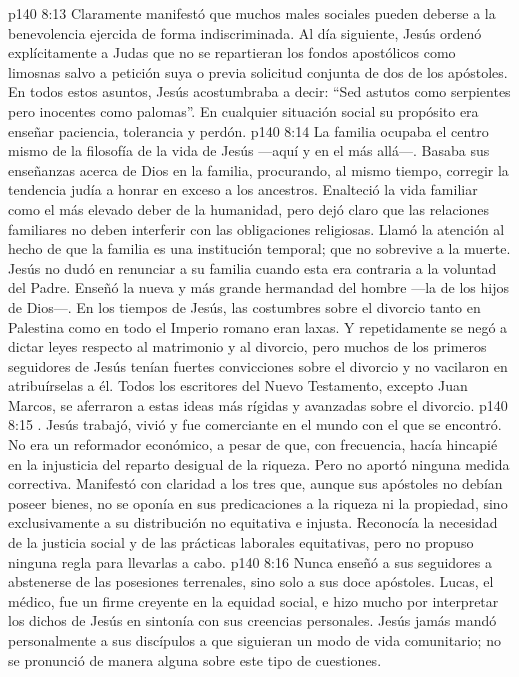 \vs p140 8:13 Claramente manifestó que muchos males sociales pueden deberse a la benevolencia ejercida de forma indiscriminada. Al día siguiente, Jesús ordenó explícitamente a Judas que no se repartieran los fondos apostólicos como limosnas salvo a petición suya o previa solicitud conjunta de dos de los apóstoles. En todos estos asuntos, Jesús acostumbraba a decir: “Sed astutos como serpientes pero inocentes como palomas”. En cualquier situación social su propósito era enseñar paciencia, tolerancia y perdón.
\vs p140 8:14 La familia ocupaba el centro mismo de la filosofía de la vida de Jesús ---aquí y en el más allá---. Basaba sus enseñanzas acerca de Dios en la familia, procurando, al mismo tiempo, corregir la tendencia judía a honrar en exceso a los ancestros. Enalteció la vida familiar como el más elevado deber de la humanidad, pero dejó claro que las relaciones familiares no deben interferir con las obligaciones religiosas. Llamó la atención al hecho de que la familia es una institución temporal; que no sobrevive a la muerte. Jesús no dudó en renunciar a su familia cuando esta era contraria a la voluntad del Padre. Enseñó la nueva y más grande hermandad del hombre ---la de los hijos de Dios---. En los tiempos de Jesús, las costumbres sobre el divorcio tanto en Palestina como en todo el Imperio romano eran laxas. Y repetidamente se negó a dictar leyes respecto al matrimonio y al divorcio, pero muchos de los primeros seguidores de Jesús tenían fuertes convicciones sobre el divorcio y no vacilaron en atribuírselas a él. Todos los escritores del Nuevo Testamento, excepto Juan Marcos, se aferraron a estas ideas más rígidas y avanzadas sobre el divorcio.
\vs p140 8:15 . Jesús trabajó, vivió y fue comerciante en el mundo con el que se encontró. No era un reformador económico, a pesar de que, con frecuencia, hacía hincapié en la injusticia del reparto desigual de la riqueza. Pero no aportó ninguna medida correctiva. Manifestó con claridad a los tres que, aunque sus apóstoles no debían poseer bienes, no se oponía en sus predicaciones a la riqueza ni la propiedad, sino exclusivamente a su distribución no equitativa e injusta. Reconocía la necesidad de la justicia social y de las prácticas laborales equitativas, pero no propuso ninguna regla para llevarlas a cabo.
\vs p140 8:16 Nunca enseñó a sus seguidores a abstenerse de las posesiones terrenales, sino solo a sus doce apóstoles. Lucas, el médico, fue un firme creyente en la equidad social, e hizo mucho por interpretar los dichos de Jesús en sintonía con sus creencias personales. Jesús jamás mandó personalmente a sus discípulos a que siguieran un modo de vida comunitario; no se pronunció de manera alguna sobre este tipo de cuestiones.
